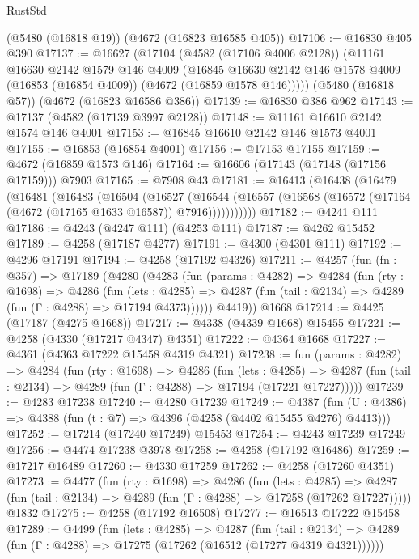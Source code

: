 \begin{lexlean}{RustStd}
\begin{coremodule}
{\begin{coremodule}
{{{{{{{{{{{{{{{{    (@5480 (@16818 @19))
    (@4672 (@16823 @16585 @405))
@17106 := @16830 @405 @390
@17137 := @16627
    (@17104
      (@4582 (@17106 @4006 @2128))
      (@11161
        @16630
        @2142
        @1579
        @146
        @4009
        (@16845 @16630 @2142 @146 @1578 @4009 (@16853 (@16854 @4009)) (@4672 (@16859 @1578 @146)))))
    (@5480 (@16818 @57))
    (@4672 (@16823 @16586 @386))
@17139 := @16830 @386 @962
@17143 := @17137 (@4582 (@17139 @3997 @2128))
@17148 := @11161 @16610 @2142 @1574 @146 @4001
@17153 := @16845 @16610 @2142 @146 @1573 @4001
@17155 := @16853 (@16854 @4001)
@17156 := @17153 @17155
@17159 := @4672 (@16859 @1573 @146)
@17164 := @16606 (@17143 (@17148 (@17156 @17159))) @7903
@17165 := @7908 @43
@17181 := @16413
    (@16438
      (@16479
        (@16481
          (@16483
            (@16504
              (@16527
                (@16544
                  (@16557 (@16568 (@16572 (@17164 (@4672 (@17165 @1633 @16587)) @7916)))))))))))
@17182 := @4241 @111
@17186 := @4243 (@4247 @111) (@4253 @111)
@17187 := @4262 @15452
@17189 := @4258 (@17187 @4277)
@17191 := @4300 (@4301 @111)
@17192 := @4296 @17191
@17194 := @4258 (@17192 @4326)
@17211 := @4257
    (fun (fn : @357) =>
    @17189
      (@4280
        (@4283
          (fun (params : @4282) =>
          @4284
            (fun (rty : @1698) =>
            @4286
              (fun (lets : @4285) =>
              @4287 (fun (tail : @2134) => @4289 (fun (Γ : @4288) => @17194 @4373))))))
        @4419))
    @1668
@17214 := @4425 (@17187 (@4275 @1668))
@17217 := @4338 (@4339 @1668) @15455
@17221 := @4258 (@4330 (@17217 @4347) @4351)
@17222 := @4364 @1668
@17227 := @4361 (@4363 @17222 @15458 @4319 @4321)
@17238 := fun (params : @4282) =>
  @4284
    (fun (rty : @1698) =>
    @4286
      (fun (lets : @4285) =>
      @4287 (fun (tail : @2134) => @4289 (fun (Γ : @4288) => @17194 (@17221 @17227)))))
@17239 := @4283 @17238
@17240 := @4280 @17239
@17249 := @4387
    (fun (U : @4386) => @4388 (fun (t : @7) => @4396 (@4258 (@4402 @15455 @4276) @4413)))
@17252 := @17214 (@17240 @17249) @15453
@17254 := @4243 @17239 @17249
@17256 := @4474 @17238 @3978
@17258 := @4258 (@17192 @16486)
@17259 := @17217 @16489
@17260 := @4330 @17259
@17262 := @4258 (@17260 @4351)
@17273 := @4477
    (fun (rty : @1698) =>
    @4286
      (fun (lets : @4285) =>
      @4287 (fun (tail : @2134) => @4289 (fun (Γ : @4288) => @17258 (@17262 @17227)))))
    @1832
@17275 := @4258 (@17192 @16508)
@17277 := @16513 @17222 @15458
@17289 := @4499
    (fun (lets : @4285) =>
    @4287
      (fun (tail : @2134) =>
      @4289 (fun (Γ : @4288) => @17275 (@17262 (@16512 (@17277 @4319 @4321))))))
}}}}}}}}}}}}}}}}
\end{coremodule}}
\end{coremodule}
\end{lexlean}

